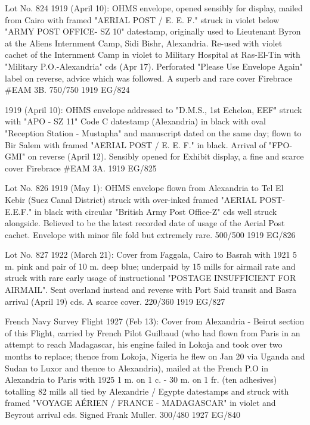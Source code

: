 \documentclass[justified]{tufte-book}
\begin{document}
%
{Lot No. 824
1919 (April 10): OHMS envelope, opened sensibly for display, mailed from Cairo with framed "AERIAL POST / E. E. F." struck in violet below "ARMY POST OFFICE- SZ 10" datestamp, originally used to Lieutenant Byron at the Aliens Internment Camp, Sidi Bishr, Alexandria. Re-used with violet cachet of the Internment Camp in violet to Military Hospital at Ras-El-Tin with "Military P.O.-Alexandria" cds (Apr 17). Perforated "Please Use Envelope Again" label on reverse, advice which was followed. A superb and rare cover Firebrace \#EAM 3B. 750/750}%
{1919}%
{EG/824}%
{}%
{}
{}%
{}


%
{1919 (April 10): OHMS envelope addressed to "D.M.S., 1st Echelon, EEF" struck with "APO - SZ 11" Code C datestamp (Alexandria) in black with oval "Reception Station - Mustapha" and manuscript dated on the same day; flown to Bir Salem with framed "AERIAL POST / E. E. F." in black. Arrival of "FPO-GMI" on reverse (April 12). Sensibly opened for Exhibit display, a fine and scarce cover Firebrace \#EAM 3A.}%
{1919}%
{EG/825}%
{}%
{}
{}%
{}



%
{Lot No. 826
1919 (May 1): OHMS envelope flown from Alexandria to Tel El Kebir (Suez Canal District) struck with over-inked framed "AERIAL POST-E.E.F." in black with circular "British Army Post Office-Z" cds well struck alongside. Believed to be the latest recorded date of usage of the Aerial Post cachet. Envelope with minor file fold but extremely rare. 500/500}%
{1919}%
{EG/826}%
{}%
{}
{}%
{}



%
{Lot No. 827
1922 (March 21): Cover from Faggala, Cairo to Basrah with 1921 5 m. pink and pair of 10 m. deep blue; underpaid by 15 mills for airmail rate and struck with rare early usage of instructional "POSTAGE INSUFFICIENT FOR AIRMAIL". Sent overland instead and reverse with Port Said transit and Basra arrival (April 19) cds. A scarce cover. 220/360}%
{1919}%
{EG/827}%
{}%
{}
{}%
{}



%
{French Navy Survey Flight 1927 (Feb 13): Cover from Alexandria - Beirut section of this Flight, carried by French Pilot Guilbaud (who had flown from Paris in an attempt to reach Madagascar, his engine failed in Lokoja and took over two months to replace; thence from Lokoja, Nigeria he flew on Jan 20 via Uganda and Sudan to Luxor and thence to Alexandria), mailed at the French P.O in Alexandria to Paris with 1925 1 m. on  1 c. - 30 m. on 1 fr. (ten adhesives) totalling 82 mills all tied by Alexandrie / Egypte datestamps and struck with framed "VOYAGE AÉRIEN / FRANCE - MADAGASCAR" in violet and Beyrout arrival cds. Signed Frank Muller. 300/480}%
{1927}%
{EG/840}%
{}%
{}
{}%
{}
\end{document}
